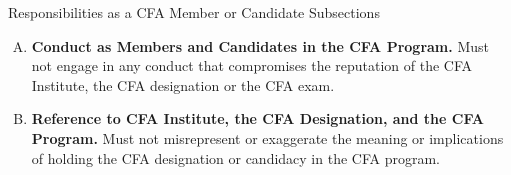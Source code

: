 \documentclass[../custom]{flashcards}
\begin{document}
\begin{flashcard}{Responsibilities as a CFA Member or Candidate Subsections}
    \begin{enumerate}[A.]
        \item \textbf{Conduct as Members and Candidates in the CFA Program.} Must not engage in any conduct that compromises the reputation of the CFA Institute, the CFA designation or the CFA exam.
        \item \textbf{Reference to CFA Institute, the CFA Designation, and the CFA Program.} Must not misrepresent or exaggerate the meaning or implications of holding the CFA designation or candidacy in the CFA program.
    \end{enumerate}
\end{flashcard}
\end{document}
